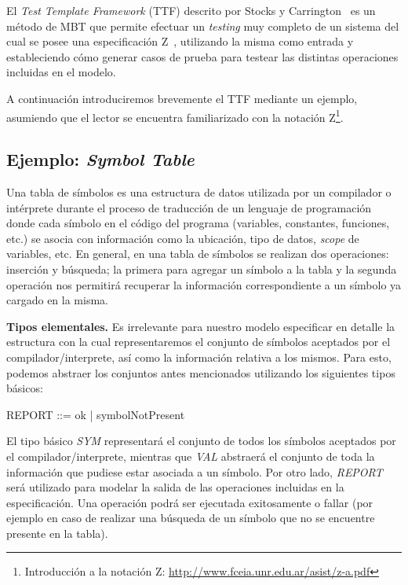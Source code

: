 El \textit{Test Template Framework} (TTF) descrito por Stocks y Carrington~\cite{stocks} es un método de MBT que permite efectuar un \textit{testing} muy completo de un sistema del cual se posee una especificación Z~\cite{spivey}, utilizando la misma como entrada y estableciendo cómo generar casos de prueba para testear las distintas operaciones incluidas en el modelo.

A continuación introduciremos brevemente el TTF mediante un ejemplo, asumiendo que el lector se encuentra familiarizado con la notación Z\footnote{Introducción a la notación Z: \url{http://www.fceia.unr.edu.ar/asist/z-a.pdf}}.

\subsection{Ejemplo: \emph{Symbol Table}}
\label{sec:ej-symbolTable}

Una tabla de símbolos es una estructura de datos utilizada por un compilador o intérprete durante el proceso de traducción de un lenguaje de programación donde cada símbolo en el código del programa (variables, constantes, funciones, etc.) se asocia con información como la ubicación, tipo de datos, \textit{scope} de variables, etc. 
En general, en una tabla de símbolos se realizan dos operaciones: inserción y búsqueda; la primera para agregar un símbolo a la tabla y la segunda operación nos permitirá recuperar la información correspondiente a un símbolo ya cargado en la misma.


\bigskip
\noindent
\textbf{Tipos elementales.} Es irrelevante para nuestro modelo especificar en detalle la estructura con la cual representaremos el conjunto de símbolos aceptados por el compilador/interprete, así como la información relativa a los mismos. Para esto, podemos abstraer los conjuntos antes mencionados utilizando los siguientes tipos básicos: 

\begin{zed}
 \also
REPORT ::= ok | symbolNotPresent
\end{zed}

El tipo básico \emph{SYM} representará el conjunto de todos los símbolos aceptados por el compilador/interprete, mientras que \emph{VAL} abstraerá el conjunto de toda la información que pudiese estar asociada a un símbolo. Por otro lado, \emph{REPORT} será utilizado para modelar la salida de las operaciones incluidas en la especificación. Una operación podrá ser ejecutada exitosamente o fallar (por ejemplo en caso de realizar una búsqueda de un símbolo que no se encuentre presente en la tabla).
 
